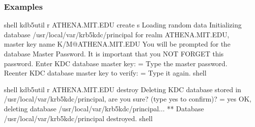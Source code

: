 \documentclass[letterpaper,10pt,english]{sphinxmanual}
\begin{document}
\subsubsection{Examples}
\label{\detokenize{admin/database:id5}}
%
\begin{sphinxVerbatim}[commandchars=\\\{\}]
shell\PYGZpc{} kdb5\PYGZus{}util \PYGZhy{}r ATHENA.MIT.EDU create \PYGZhy{}s
Loading random data
Initializing database \PYGZsq{}/usr/local/var/krb5kdc/principal\PYGZsq{} for realm \PYGZsq{}ATHENA.MIT.EDU\PYGZsq{},
master key name \PYGZsq{}K/M@ATHENA.MIT.EDU\PYGZsq{}
You will be prompted for the database Master Password.
It is important that you NOT FORGET this password.
Enter KDC database master key:  \PYGZlt{}= Type the master password.
Re\PYGZhy{}enter KDC database master key to verify:  \PYGZlt{}= Type it again.
shell\PYGZpc{}

shell\PYGZpc{} kdb5\PYGZus{}util \PYGZhy{}r ATHENA.MIT.EDU destroy
Deleting KDC database stored in \PYGZsq{}/usr/local/var/krb5kdc/principal\PYGZsq{}, are you sure?
(type \PYGZsq{}yes\PYGZsq{} to confirm)?  \PYGZlt{}= yes
OK, deleting database \PYGZsq{}/usr/local/var/krb5kdc/principal\PYGZsq{}...
** Database \PYGZsq{}/usr/local/var/krb5kdc/principal\PYGZsq{} destroyed.
shell\PYGZpc{}
\end{sphinxVerbatim}
\end{document}
